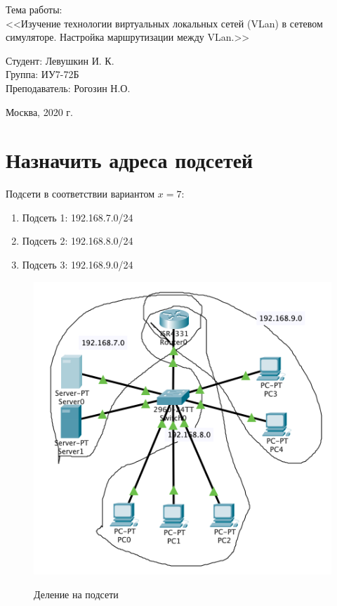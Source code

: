\documentclass[a4paper,12pt]{article}
\begin{document}
	\huge
	\begin{center}
		Тема работы:\\
		<<Изучение технологии виртуальных локальных сетей (VLan) в сетевом симуляторе. Настройка маршрутизации между VLan.>>
	\end{center}
	\vspace*{20mm} 
	
	\large
	\begin{flushright}
		Студент: Левушкин И. К. \\
		Группа: ИУ7-72Б \\
		Преподаватель: Рогозин Н.О. \\
	\end{flushright}
	
	\vspace*{25mm}
	\begin{center}
		Москва, 2020 г.  
	\end{center}
	\thispagestyle{empty}
	
	
	\newpage
	
	\section{Назначить адреса подсетей}
	
	Подсети в соответствии вариантом $x = 7$:
	
	\begin{enumerate}
		\item Подсеть 1: 192.168.7.0/24
		\item Подсеть 2: 192.168.8.0/24
		\item Подсеть 3: 192.168.9.0/24
	\end{enumerate}

	\begin{figure}[h!]
		\begin{center}
			{\includegraphics[scale = 0.6]{img/1.png}}
			\caption{Деление на подсети}
			\label{ris:1}
		\end{center}
	\end{figure}
\end{document}
